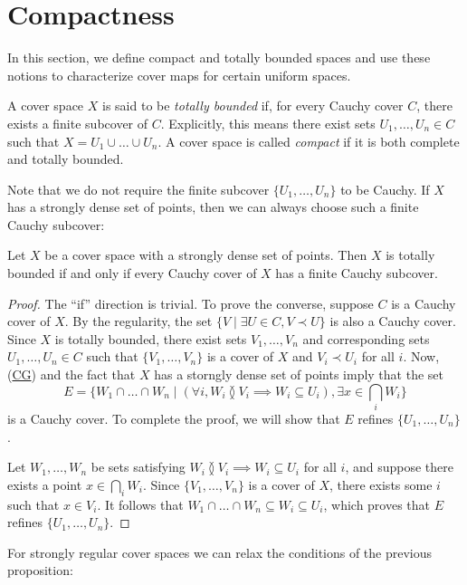 \documentclass[reqno]{amsart}
\newcommand{\axref}[1]{(\hyperref[ax:#1]{#1})}
\theoremstyle{definition}
\theoremstyle{remark}
\numberwithin{figure}{section}
\newcommand{\overlap}[2]{#1 \between #2}
\newcommand{\rb}{\prec}
\begin{document}
\section{Compactness}
\label{sec:compact}

In this section, we define compact and totally bounded spaces and use these notions to characterize cover maps for certain uniform spaces.

A cover space $X$ is said to be \emph{totally bounded} if, for every Cauchy cover $C$, there exists a finite subcover of $C$.
Explicitly, this means there exist sets $U_1, \ldots, U_n \in C$ such that $X = U_1 \cup \ldots \cup U_n$.
A cover space is called \emph{compact} if it is both complete and totally bounded.

Note that we do not require the finite subcover $\{ U_1, \ldots, U_n \}$ to be Cauchy.
If $X$ has a strongly dense set of points, then we can always choose such a finite Cauchy subcover:

\begin{prop}
Let $X$ be a cover space with a strongly dense set of points.
Then $X$ is totally bounded if and only if every Cauchy cover of $X$ has a finite Cauchy subcover.
\end{prop}
\begin{proof}
The ``if'' direction is trivial.
To prove the converse, suppose $C$ is a Cauchy cover of $X$.
By the regularity, the set $\{ V \mid \exists U \in C, V \rb U \}$ is also a Cauchy cover.
Since $X$ is totally bounded, there exist sets $V_1, \ldots, V_n$ and corresponding sets $U_1, \ldots, U_n \in C$ such that $\{ V_1, \ldots, V_n \}$ is a cover of $X$ and $V_i \rb U_i$ for all $i$.
Now, \axref{CG} and the fact that $X$ has a storngly dense set of points imply that the set
\[ E = \{ W_1 \cap \ldots \cap W_n \mid (\forall i, \overlap{W_i}{V_i} \implies W_i \subseteq U_i), \exists x \in \bigcap_i W_i \} \]
is a Cauchy cover.
To complete the proof, we will show that $E$ refines $\{ U_1, \ldots, U_n \}$.

Let $W_1, \ldots, W_n$ be sets satisfying $\overlap{W_i}{V_i} \implies W_i \subseteq U_i$ for all $i$, and suppose there exists a point $x \in \bigcap_i W_i$.
Since $\{ V_1, \ldots, V_n \}$ is a cover of $X$, there exists some $i$ such that $x \in V_i$.
It follows that $W_1 \cap \ldots \cap W_n \subseteq W_i \subseteq U_i$, which proves that $E$ refines $\{ U_1, \ldots, U_n \}$.
\end{proof}

For strongly regular cover spaces we can relax the conditions of the previous proposition:
\end{document}
